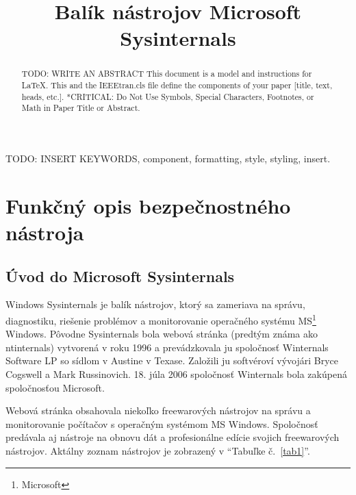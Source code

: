 \documentclass[conference]{IEEEtran}
\begin{document}
\title{Balík nástrojov Microsoft Sysinternals}

\author{
}

\maketitle

\begin{abstract}
TODO: WRITE AN ABSTRACT
This document is a model and instructions for \LaTeX.
This and the IEEEtran.cls file define the components of your paper [title, text, heads, etc.]. *CRITICAL: Do Not Use Symbols, Special Characters, Footnotes, 
or Math in Paper Title or Abstract.
\end{abstract}

\begin{IEEEkeywords}
TODO: INSERT KEYWORDS, component, formatting, style, styling, insert.
\end{IEEEkeywords}


\nocite{*}

\section{Funkčný opis bezpečnostného nástroja}
\subsection{Úvod do Microsoft Sysinternals}

Windows Sysinternals je balík nástrojov, ktorý sa zameriava na správu, diagnostiku, riešenie problémov a monitorovanie operačného systému MS\footnote{Microsoft} Windows. Pôvodne Sysinternals bola webová stránka (predtým známa ako ntinternals) vytvorená v roku 1996 a prevádzkovala ju spoločnosť Winternals Software LP so sídlom v Austine v Texase. Založili ju softvéroví vývojári Bryce Cogswell a Mark Russinovich. 18. júla 2006 spoločnosť Winternals bola zakúpená spoločnosťou Microsoft.

Webová stránka obsahovala niekoľko freewarových nástrojov na správu a monitorovanie počítačov s operačným systémom MS Windows. Spoločnosť predávala aj nástroje na obnovu dát a profesionálne edície svojich freewarových nástrojov.
Aktálny zoznam nástrojov je zobrazený v ``Tabuľke č.~\ref{tab1}''.
\end{document}

